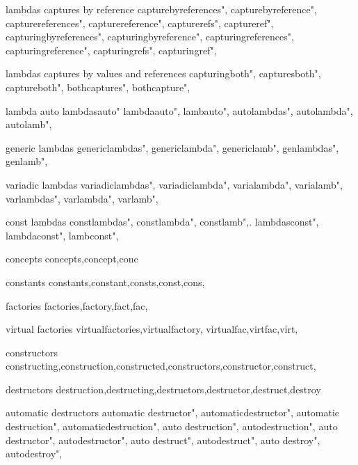          lambdas captures by reference 
        capturebyreferences",  
        capturebyreference",  
        capturereferences",  
        capturereference",  
        capturerefs",  
        captureref",  
        capturingbyreferences",  
        capturingbyreference",  
        capturingreferences",  
        capturingreference",  
        capturingrefs",  
        capturingref",  
        
         lambdas captures by values and references 
        capturingboth",  
        capturesboth",  
        captureboth",  
        bothcaptures",  
        bothcapture",  
        
         lambda auto
        lambdasauto"
        lambdaauto",
        lambauto",
        autolambdas",
        autolambda",
        autolamb",
        
         generic lambdas
        genericlambdas",  
        genericlambda",  
        genericlamb",  
        genlambdas",  
        genlamb",  
        
         variadic lambdas 
        variadiclambdas",  
        variadiclambda",  
        varialambda",  
        varialamb",  
        varlambdas",  
        varlambda",  
        varlamb",  
        
         const lambdas 
        constlambdas",
        constlambda",
        constlamb",.
        lambdasconst",
        lambdaconst",
        lambconst",
        
         concepts 
        concepts,concept,conc
        
         constants 
        constants,constant,consts,const,cons,
        
         factories 
        factories,factory,fact,fac,
        
         virtual factories 
        virtualfactories,virtualfactory,  
        virtualfac,virtfac,virt,
        
         constructors 
        constructing,construction,constructed,constructors,constructor,construct,
        
         destructors
        destruction,destructing,destructors,destructor,destruct,destroy
        
         automatic destructors 
        automatic destructor",  
        automaticdestructor",  
        automatic destruction", 
        automaticdestruction", 
        auto destruction",  
        autodestruction",  
        auto destructor",  
        autodestructor",  
        auto destruct",  
        autodestruct",  
        auto destroy",  
        autodestroy",  
        
